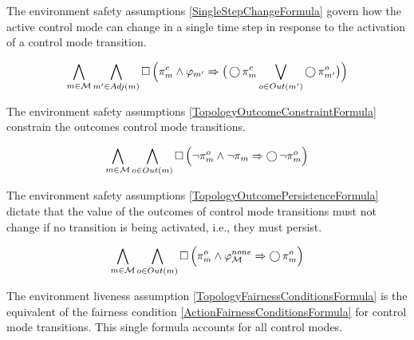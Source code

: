 The environment safety assumptions \eqref{SingleStepChangeFormula} govern how the active control mode can change in a single time step in response to the activation of a control mode transition.

\begin{equation}\label{SingleStepChangeFormula}
	\bigwedge \limits_{m \in \mathcal{M}} \bigwedge \limits_{m^\prime \in Adj(m)} \operatorname{\Box} \Big( \pi_m^c \wedge  \varphi_{m^\prime} \Rightarrow \big( \operatorname{\bigcirc} \pi_{m}^c \bigvee \limits_{o \in Out(m^\prime)} \operatorname{\bigcirc} \pi_{m^\prime}^o \big) \Big)
\end{equation}

The environment safety assumptions \eqref{TopologyOutcomeConstraintFormula} constrain the outcomes control mode transitions.

\begin{equation}\label{TopologyOutcomeConstraintFormula}
	\bigwedge \limits_{m \in \mathcal{M}} \bigwedge \limits_{o \in Out(m)} \operatorname{\Box} \Big( \lnot \pi_m^o \wedge \lnot \pi_m \Rightarrow \operatorname{\bigcirc} \lnot \pi_m^o \Big)
\end{equation}

The environment safety assumptions \eqref{TopologyOutcomePersistenceFormula} dictate that the value of the outcomes of control mode transitions must not change if no transition is being activated, i.e., they must persist.

\begin{equation}\label{TopologyOutcomePersistenceFormula}
	\bigwedge \limits_{m \in \mathcal{M}} \bigwedge \limits_{o \in Out(m)} \operatorname{\Box} \Big( \pi_m^o \wedge \varphi_\mathcal{M}^{none} \Rightarrow \operatorname{\bigcirc} \pi_m^o \Big)
\end{equation}

The environment liveness assumption \eqref{TopologyFairnessConditionsFormula} is the equivalent of the fairness condition \eqref{ActionFairnessConditionsFormula} for control mode transitions.
This single formula accounts for all control modes.


